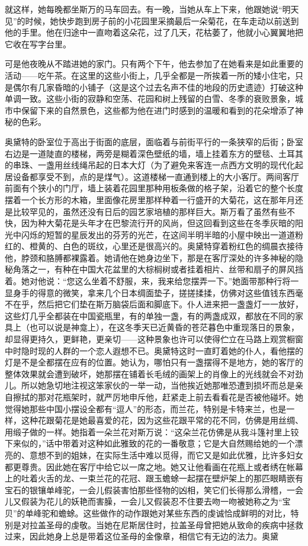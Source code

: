 \par 就这样，她每晚都坐斯万的马车回去。有一晚，当她从车上下来，他跟她说“明天见”的时候，她快步跑到房子前的小花园里采摘最后一朵菊花，在车走动以前送到他的手里。他在归途中一直吻着这朵花，过了几天，花枯萎了，他就小心翼翼地把它收在写字台里。
\par 可是他夜晚从不踏进她的家门。只有两个下午，他去参加了在她看来是如此重要的活动——吃午茶。在这里的这些小街上，几乎全都是一所挨着一所的矮小住宅，只是偶尔有几家昏暗的小铺子（这是这个过去名声不佳的地段的历史遗迹）打破这种单调一致。这些小街的寂静和空荡、花园和树上残留的白雪、冬季的衰败景象，城市中保留下来的自然景色，这些都为他在进门时感到的温暖和看到的花朵增添了神秘的色彩。
\par 奥黛特的卧室位于高出于街面的底层，面临着与前街平行的一条狭窄的后街；卧室右边是一道陡直的楼梯，两旁是糊着深色壁纸的墙，墙上挂着东方的壁毯、土耳其的串珠、一盏用丝线绳吊起的日本大灯（为了避免来客连一点西方文明的现代化起居设备都享受不到，点的是煤气）。这道楼梯一直通到楼上的大小客厅。两间客厅前面有个狭小的门厅，墙上装着花园里那种用板条做的格子架，沿着它的整个长度摆着一个长方形的木箱，里面像花房里那样种着一行盛开的大菊花，这在那年月还是比较罕见的，虽然还没有日后的园艺家培植的那样巨大。斯万看了虽然有些不快，因为种大菊花是头年才在巴黎流行开的风尚，但这回看到这些在冬季灰暗的阳光中闪烁的短暂的星辰发出的芬芳的光芒，在这间半明半暗的小屋中映出一道道粉红的、橙黄的、白色的斑纹，心里还是很高兴的。奥黛特穿着粉红色的绸晨衣接待他，脖颈和胳膊都裸露着。她请他在她身边坐下，那是在客厅深处的许多神秘的隐秘角落之一，有种在中国大花盆里的大棕榈树或者挂着相片、丝带和扇子的屏风挡着。她对他说：“您这么坐着不舒服，来，我来给您摆弄一下。”她面带那种行将一显身手的得意的微笑，拿来几个日本绸面垫子，搓搓揉揉，仿佛对这些值钱东西毫不在乎，然后把它们垫在斯万脑袋后面和脚底下。仆人进来把一盏盏灯一一放好，这些灯几乎全都装在中国瓷瓶里，有的单独一盏，有的两盏成双，都放在不同的家具上（也可以说是神龛上），在这冬季天已近黄昏的苍茫暮色中重现落日的景象，却显得更持久，更鲜艳，更亲切——这种景象也许可以使得伫立在马路上观赏橱窗中时隐时现的人群的一个恋人遐想不已。奥黛特这时一直盯着她的仆人，看他摆的灯是不是全都摆在应有的位置。她认为，哪怕只有一盏摆得不是地方，她的客厅的整体效果就会遭到破坏，她那摆在铺着长毛绒的画架上的肖像上的光线就会不对劲儿。所以她急切地注视这笨家伙的一举一动，当他挨近她那唯恐遭到损坏而总是亲自擦拭的那对花瓶架时，就严厉地申斥他，赶紧走上前去看看花是否被他碰坏。她觉得她那些中国小摆设全都有“逗人”的形态，而兰花，特别是卡特来兰，也是一样，这种花跟菊花是她最喜爱的花，因为这些花跟平常的花不同，仿佛是用丝绸、用缎子做的一样。她指着一朵兰花对斯万说：“这朵兰花仿佛是从我斗篷衬里上铰下来似的，”话中带着对这种如此雅致的花的一番敬意；它是大自然赐给她的一个漂亮的、意想不到的姐妹，在实际生活中难以觅得，而它又是如此优雅，比许多妇女都更尊贵。因此她在客厅中给它以一席之地。她又让他看画在花瓶上或者绣在帐幕上的吐着火舌的龙、一束兰花的花冠、跟玉蟾蜍一起摆在壁炉架上的那匹眼睛嵌有宝石的银镶单峰驼，一会儿假装害怕那些怪物的凶相，笑它们长得那么滑稽，一会儿又假装为花儿的妖艳而害臊，一会儿又假装忍不住要去吻一吻被她称之为“宝贝”的单峰驼和蟾蜍。这些做作的动作跟她对某些东西的虔诚恰成鲜明的对比，特别是对拉盖圣母的虔敬。当她在尼斯居住时，拉盖圣母曾把她从致命的疾病中拯救过来，因此她身上总是带着这位圣母的金像章，相信它有无边的法力。奥黛